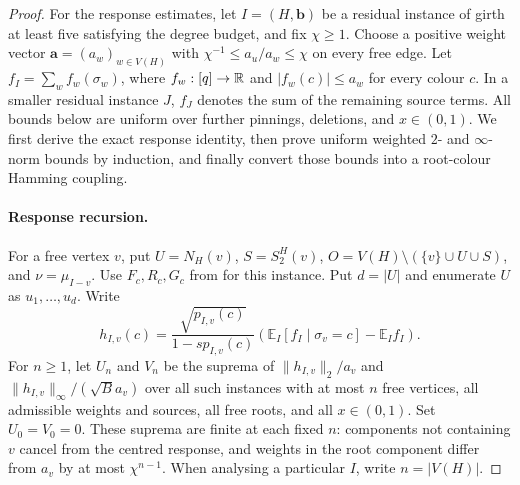 \begin{proof}
For the response estimates, let $I=(H,\mathbf b)$ be a residual instance
of girth at least five satisfying the degree budget, and fix $\chi\ge1$.
Choose a positive weight vector $\mathbf a=(a_w)_{w\in V(H)}$ with
$\chi^{-1}\le a_u/a_w\le\chi$ on every free edge.  Let
$f_I=\sum_w f_w(\sigma_w)$, where $f_w:[q]\to\mathbb R$ and
$|f_w(c)|\le a_w$ for every colour $c$.  In a smaller residual instance
$J$, $f_J$ denotes the sum of the remaining source terms.  All bounds below
are uniform over further pinnings, deletions, and $x\in(0,1)$.
We first derive the exact response identity, then prove uniform weighted
$2$- and $\infty$-norm bounds by induction, and finally convert those bounds
into a root-colour Hamming coupling.

\paragraph{Response recursion.}
For a free vertex $v$, put $U=N_H(v)$, $S=S_2^H(v)$,
$O=V(H)\setminus(\{v\}\cup U\cup S)$, and $\nu=\mu_{I-v}$.
Use $F_c,R_c,G_c$ from  for this instance.
Put $d=|U|$ and enumerate $U$ as $u_1,\ldots,u_d$.  Write
\begin{equation}\label{eq:girth5-score}
 h_{I,v}(c)=\frac{\sqrt{p_{I,v}(c)}}{1-sp_{I,v}(c)}
 \left(\mathbb E_I[f_I\mid\sigma_v=c]-\mathbb E_I f_I\right).
\end{equation}
For $n\ge1$, let $U_n$ and $V_n$ be the suprema of
$\|h_{I,v}\|_2/a_v$ and $\|h_{I,v}\|_\infty/(\sqrt B a_v)$ over all
such instances with at most $n$ free vertices, all admissible weights and
sources, all free roots, and all $x\in(0,1)$.  Set $U_0=V_0=0$.
These suprema are finite at each fixed $n$: components not containing $v$
cancel from the centred response, and weights in the root component differ
from $a_v$ by at most $\chi^{n-1}$.  When analysing a particular $I$, write
$n=|V(H)|$.


\end{proof}
